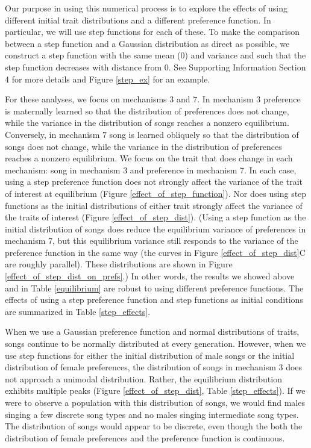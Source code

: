 \documentclass[12pt]{article}
\begin{document}
Our purpose in using this numerical process is to explore the effects of using different initial trait distributions and a different preference function. In particular, we will use step functions for each of these. To make the comparison between a step function and a Gaussian distribution as direct as possible, we construct a step function with the same mean ($0$) and variance and such that the step function decreases with distance from $0$. See Supporting Information Section 4 for more details and Figure \ref{step_ex} for an example.
  
For these analyses, we focus on mechanisms $3$ and $7$. In mechanism $3$ preference is maternally learned so that the distribution of preferences does not change, while the variance in the distribution of songs reaches a nonzero equilibrium. Conversely, in mechanism $7$ song is learned obliquely so that the distribution of songs does not change, while the variance in the distribution of preferences reaches a nonzero equilibrium. We focus on the trait that does change in each mechanism: song in mechanism 3 and preference in mechanism 7. In each case, using a step preference function does not strongly affect the variance of the trait of interest at equilibrium (Figure \ref{effect_of_step_function}). Nor does using step functions as the initial distributions of either trait strongly affect the variance of the traits of interest (Figure \ref{effect_of_step_dist}). (Using a step function as the initial distribution of songs does reduce the equilibrium variance of preferences in mechanism 7, but this equilibrium variance still responds to the variance of the preference function in the same way (the curves in Figure \ref{effect_of_step_dist}C are roughly parallel). These distributions are shown in Figure \ref{effect_of_step_dist_on_prefs}.) In other words, the results we showed above and in Table \ref{equilibrium} are robust to using different preference functions. The effects of using a step preference function and step functions as initial conditions are summarized in Table \ref{step_effects}.

When we use a Gaussian preference function and normal distributions of traits, songs continue to be normally distributed at every generation. However, when we use step functions for either the initial distribution of male songs or the initial distribution of female preferences, the distribution of songs in mechanism $3$ does not approach a unimodal distribution. Rather, the equilibrium distribution exhibits multiple peaks (Figure \ref{effect_of_step_dist}, Table \ref{step_effects}). If we were to observe a population with this distribution of songs, we would find males singing a few discrete song types and no males singing intermediate song types. The distribution of songs would appear to be discrete, even though the both the distribution of female preferences and the preference function is continuous.
\end{document}
